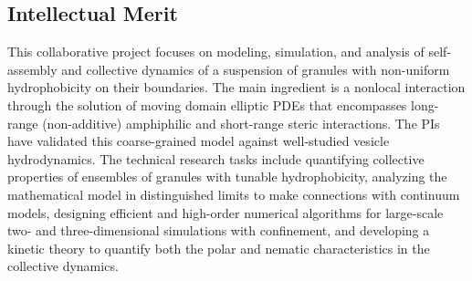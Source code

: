 \documentclass[10pt]{article}
\begin{document}
\subsection*{Intellectual Merit}
\vspace{-0.1in}
This collaborative project focuses on modeling, simulation, and analysis
of self-assembly and collective dynamics of a suspension of granules
with non-uniform hydrophobicity on their boundaries. The main ingredient
is a nonlocal interaction through the solution of moving domain elliptic
PDEs that encompasses long-range (non-additive) amphiphilic and
short-range steric interactions. The PIs have validated this
coarse-grained model against well-studied vesicle hydrodynamics. The
technical research tasks include quantifying collective properties of
ensembles of granules with tunable hydrophobicity, analyzing the
mathematical model in distinguished limits to make connections with
continuum models, designing efficient and high-order numerical
algorithms for large-scale two- and three-dimensional simulations with
confinement, and developing a kinetic theory to quantify both the polar
and nematic characteristics in the collective dynamics.

\end{document}
